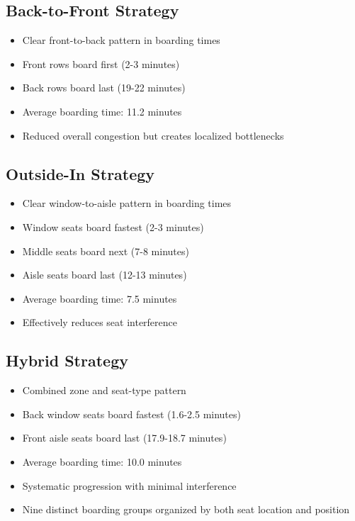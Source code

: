 \documentclass{article}
\begin{document}
\subsection{Back-to-Front Strategy}
\begin{itemize}
    \item Clear front-to-back pattern in boarding times
    \item Front rows board first (2-3 minutes)
    \item Back rows board last (19-22 minutes)
    \item Average boarding time: 11.2 minutes
    \item Reduced overall congestion but creates localized bottlenecks
\end{itemize}

\subsection{Outside-In Strategy}
\begin{itemize}
    \item Clear window-to-aisle pattern in boarding times
    \item Window seats board fastest (2-3 minutes)
    \item Middle seats board next (7-8 minutes)
    \item Aisle seats board last (12-13 minutes)
    \item Average boarding time: 7.5 minutes
    \item Effectively reduces seat interference
\end{itemize}

\subsection{Hybrid Strategy}
\begin{itemize}
    \item Combined zone and seat-type pattern
    \item Back window seats board fastest (1.6-2.5 minutes)
    \item Front aisle seats board last (17.9-18.7 minutes)
    \item Average boarding time: 10.0 minutes
    \item Systematic progression with minimal interference
    \item Nine distinct boarding groups organized by both seat location and position
\end{itemize}
\end{document}
